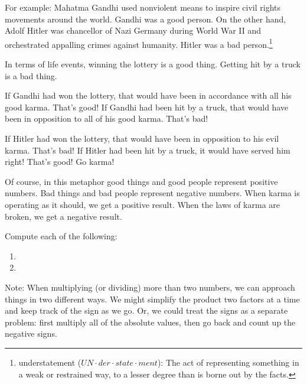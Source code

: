 For example: Mahatma Gandhi used nonviolent means to inspire civil rights movements around the world. Gandhi was a good person. On the other hand, Adolf Hitler was chancellor of Nazi Germany during World War II and orchestrated appalling crimes against humanity. Hitler was a bad person.\footnote{understatement ($UN \cdot der \cdot state \cdot ment$): The act of representing something in a weak or restrained way, to a lesser degree than is borne out by the facts.}

In terms of life events, winning the lottery is a good thing. Getting hit by a truck is a bad thing.

If Gandhi had won the lottery, that would have been in accordance with all his good karma. That's good! If Gandhi had been hit by a truck, that would have been in opposition to all of his good karma. That's bad!

If Hitler had won the lottery, that would have been in opposition to his evil karma. That's bad! If Hitler had been hit by a truck, it would have served him right! That's good! Go karma!

Of course, in this metaphor good things and good people represent positive numbers. Bad things and bad people represent negative numbers. When karma is operating as it should, we get a positive result. When the laws of karma are broken, we get a negative result.

\begin{boxex}
Compute each of the following:

\begin{enumerate}[itemsep=10pt]
\item {}

\item {}
\end{enumerate}
\end{boxex}

Note: When multiplying (or dividing) more than two numbers, we can approach things in two different ways. We might simplify the product two factors at a time and keep track of the sign as we go. Or, we could treat the signs as a separate problem: first multiply all of the absolute values, then go back and count up the negative signs. %


